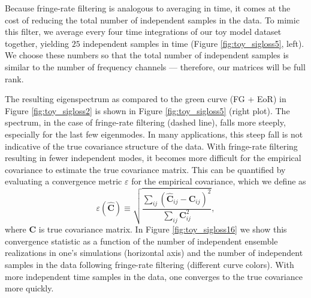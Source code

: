 \documentclass[preprint2,numberedappendix,tighten]{aastex6}  %
\newcommand{\C}{\mathbf{C}}
\newcommand{\Chat}{\mathbf{\hat{C}}}
\newcommand{\cc}[1]{{\color{purple} \textbf{[CC: #1]}}}
\begin{document}
Because fringe-rate filtering is analogous to averaging in time, it comes at the cost of reducing the total number of independent 
samples in the data. To mimic this filter, we average every four time integrations of our toy model dataset together, yielding 
$25$ independent samples in time (Figure \ref{fig:toy_sigloss5}, left). We choose these numbers so that the total number of 
independent samples is similar to the number of frequency channels --- therefore, our matrices will be full rank.

The resulting eigenspectrum as compared to the green curve (FG + EoR) in Figure \ref{fig:toy_sigloss2} is shown in Figure 
\ref{fig:toy_sigloss5} (right plot). The spectrum, in the case of fringe-rate filtering (dashed line), falls more steeply, especially for 
the last few eigenmodes. In many applications, this steep fall is not indicative of the true covariance structure of the data. With 
fringe-rate filtering resulting in fewer independent modes, it becomes more difficult for the empirical covariance to estimate the 
true covariance matrix. This can be quantified by evaluating a convergence metric $\varepsilon$ for the empirical covariance, which we define as
\begin{equation}
\label{eq:converge}
\varepsilon (\Chat) \equiv \sqrt{\frac{\sum_{ij} (\Chat_{ij} - \C_{ij})^2}{\sum_{ij} \C_{ij}^2}},
\end{equation}
where $\C$ is true covariance matrix. In Figure \ref{fig:toy_sigloss16} we show this convergence statistic as a function of the number of independent ensemble realizations in one's simulations (horizontal axis) and the number of independent samples in the data following fringe-rate filtering (different curve colors). With more independent time samples in the data, one converges to the true covariance more quickly. 
\end{document}
